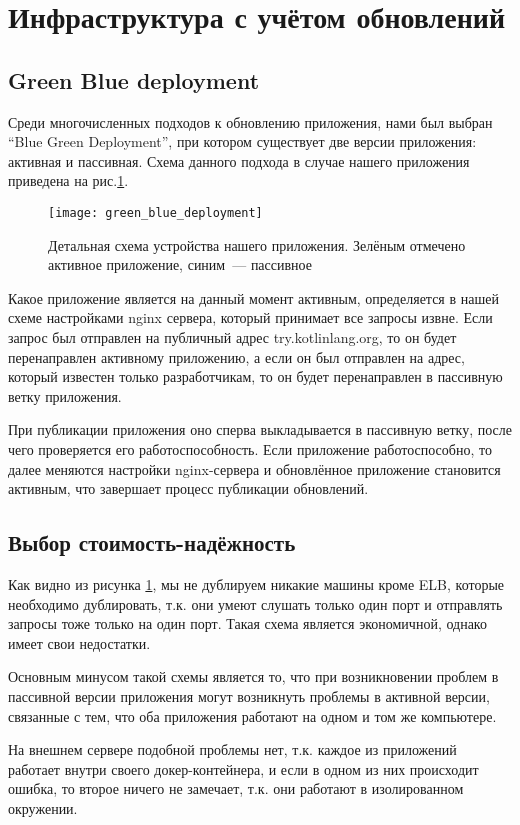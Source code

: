 \section{Инфраструктура с учётом обновлений}
\subsection{Green Blue deployment}
	Среди многочисленных подходов к обновлению приложения, нами был выбран ``Blue Green Deployment'', при котором существует две версии приложения: активная и пассивная. Схема данного подхода в случае нашего приложения приведена на рис.\ref{fig:green_blue_deployment}.
\begin{figure}[h]
    \centering
    \texttt{[image: green\_blue\_deployment]} 
    \caption{Детальная схема устройства нашего приложения. Зелёным отмечено активное приложение, синим~--- пассивное}
    \label{fig:green_blue_deployment}
\end{figure}

	Какое приложение является на данный момент активным, определяется в нашей схеме настройками nginx сервера, который принимает все запросы извне. Если запрос был отправлен на публичный адрес try.kotlinlang.org, то он будет перенаправлен активному приложению, а если он был отправлен на адрес, который известен только разработчикам, то он будет перенаправлен в пассивную ветку приложения.
	
	При публикации приложения оно сперва выкладывается в пассивную ветку, после чего проверяется его работоспособность. Если приложение работоспособно, то далее меняются настройки nginx-сервера  и обновлённое приложение становится активным, что завершает процесс публикации обновлений.
\subsection{Выбор стоимость-надёжность}
	Как видно из рисунка \ref{fig:green_blue_deployment}, мы не дублируем никакие машины кроме ELB, которые необходимо дублировать, т.к. они умеют слушать только один порт и отправлять запросы тоже только на один порт. Такая схема является экономичной, однако имеет свои недостатки.
	
	Основным минусом такой схемы является то, что при возникновении проблем в пассивной версии приложения могут возникнуть проблемы в активной версии, связанные с тем, что оба приложения работают на одном и том же компьютере.
	
	На внешнем сервере подобной проблемы нет, т.к. каждое из приложений работает внутри своего докер-контейнера, и если в одном из них происходит ошибка, то второе ничего не замечает, т.к. они работают в изолированном окружении.
	
